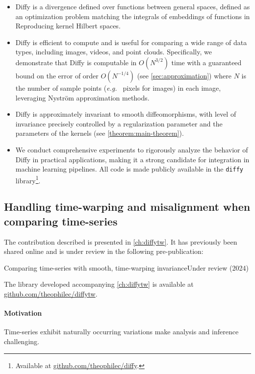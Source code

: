 \begin{itemize}
    \item Diffy is a divergence defined over functions between general spaces, defined as an optimization problem matching the integrals of embeddings of functions in Reproducing kernel Hilbert spaces.
    \item Diffy is efficient to compute and is useful for comparing a wide range of data types, including images, videos, and point clouds. Specifically, we demonstrate that Diffy is computable in $O(N^{3/2})$ time with a guaranteed bound on the error of order $O(N^{-1/4})$ (see \cref{sec:approximation}) where $N$ is the number of sample points (\emph{e.g.\ } pixels for images) in each image, leveraging Nyström approximation methods.
    \item Diffy is approximately invariant to smooth diffeomorphisms, with level of invariance precisely controlled by a regularization parameter and the parameters of the kernels (see \cref{theorem:main-theorem}).
    \item We conduct comprehensive experiments to rigorously analyze the behavior of Diffy in practical applications, making it a strong candidate for integration in machine learning pipelines. All code is made publicly available in the \texttt{diffy} library\footnote{Available at \url{github.com/theophilec/diffy}.}.
\end{itemize}

\subsection{Handling time-warping and misalignment when comparing time-series}
\begin{mdframed}
The contribution described is presented in \cref{ch:diffytw}.
\noindent It has previously been shared online and is under review in the following pre-publication:
\begin{mdframed}
{Comparing time-series with smooth, time-warping invariance}{Under review (2024)}
\end{mdframed}
The library developed accompanying \cref{ch:diffytw} is available at \url{github.com/theophilec/diffytw}.
\end{mdframed}
\paragraph{Motivation}
Time-series exhibit naturally occurring variations make analysis and inference challenging.

